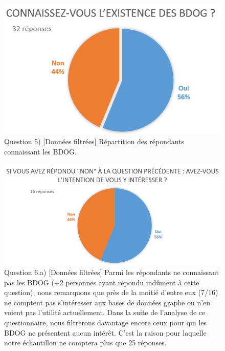 \documentclass[a4paper,fleqn,12pt,oneside]{book}
\begin{document}
\begin{figure}[!ht]
\centering
\includegraphics[scale=1]{figures/QExistFilt.png}
\caption{Question 5) [Données filtrées] Répartition des répondants connaissant les BDOG.}
\label{fig:QExistFilt}
\end{figure}

\begin{figure}[!ht]
\centering
\includegraphics[scale=0.8]{figures/QIntFilt.png}
\caption{Question 6.a) [Données filtrées] Parmi les répondants ne connaissant pas les BDOG (+2 personnes ayant  répondu indûment à cette question), nous remarquons que près de la moitié d'entre eux (7/16) ne comptent pas s'intéresser aux bases de données graphe ou n'en voient pas l'utilité actuellement. Dans la suite de l'analyse de ce questionnaire, nous filtrerons davantage encore ceux pour qui les BDOG ne présentent aucun intérêt. C'est la raison pour laquelle notre échantillon ne comptera plus que 25 réponses.}
\label{fig:QIntFilt}
\end{figure}

\newpage
{}
\end{document}
